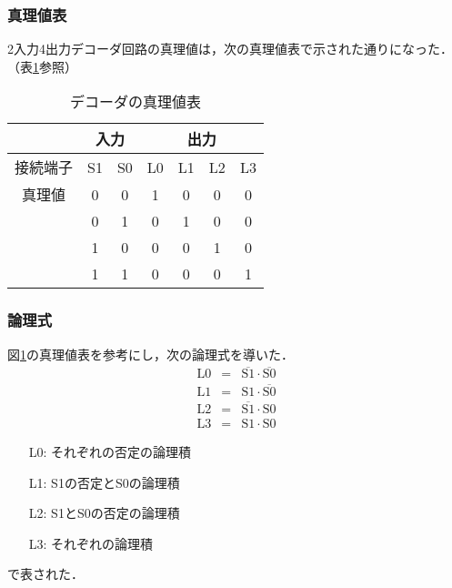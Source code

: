 \subsubsection{真理値表}
\label{decoderencoder_shinriti}
2入力4出力デコーダ回路の真理値は，次の真理値表で示された通りになった．（表\ref{tab:24decoder_shinrititab}参照）

\begin {table}[ht]
	\begin {center}
		\caption {デコーダの真理値表}%
		\begin {tabular}{c|cc|cccc}\hline
			\multicolumn{1}{c|}{}&%
			\multicolumn{2}{c}{入力}&%
			\multicolumn{4}{|c}{出力}\\ %
			\hline
			\multicolumn{1}{c|}{接続端子}&%
			\multicolumn{1}{c}{S1}&%
			\multicolumn{1}{c}{S0}&%
			\multicolumn{1}{|c}{L0}& %
			\multicolumn{1}{c}{L1}&%
			\multicolumn{1}{c}{L2}&%
			\multicolumn{1}{c}{L3}\\%
			\hline
			真理値&0&0&1&0&0&0\\%
			&0&1&0&1&0&0\\%
			&1&0&0&0&1&0\\%
			&1&1&0&0&0&1\\
			\hline
		\end{tabular}
		\label {tab:24decoder_shinrititab}%
	\end{center}
\end{table}

\subsubsection{論理式}
図\ref{tab:24decoder_shinrititab}の真理値表を参考にし，次の論理式を導いた．
\label{24decoder_ronrishiki}
\begin{eqnarray}
	\mathrm{L0} &=& \overline{\mathrm{S1}} \cdot \overline{\mathrm{S0}} \nonumber \\
	\mathrm{L1} &=& \mathrm{S1} \cdot \overline{\mathrm{S0}} \nonumber \\
	\mathrm{L2} &=& \overline{\mathrm{S1}} \cdot \mathrm{S0} \nonumber \\
	\mathrm{L3} &=& \mathrm{S1} \cdot \mathrm{S0} \nonumber 
\end{eqnarray}

\begin{itemize}
	\item [L0:]それぞれの否定の論理積
	\item [L1:]S1の否定とS0の論理積
	\item [L2:]S1とS0の否定の論理積
	\item [L3:]それぞれの論理積
\end{itemize}
で表された．

